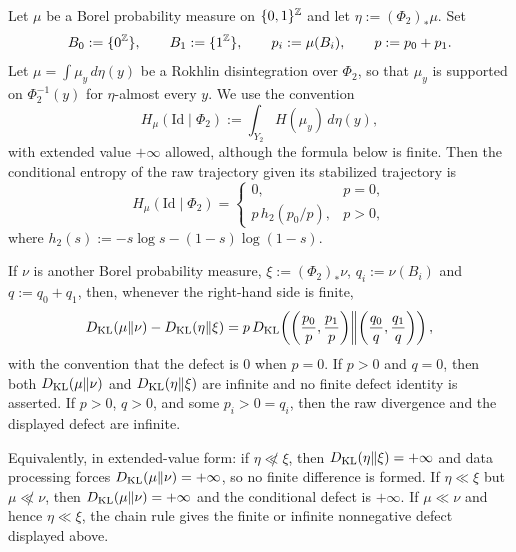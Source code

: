 \begin{corollary}\label{cor:m2-defect-formulas}
Let $\mu$ be a Borel probability measure on $\{0,1\}^{\mathbb{Z}}$ and let
$\eta:=(\Phi_2)_*\mu$.  Set
\[
B_0:=\{0^{\mathbb{Z}}\},\qquad B_1:=\{1^{\mathbb{Z}}\},\qquad
p_i:=\mu(B_i),\qquad p:=p_0+p_1.
\]
Let $\mu=\int\mu_y\,d\eta(y)$ be a Rokhlin disintegration over $\Phi_2$,
so that $\mu_y$ is supported on $\Phi_2^{-1}(y)$ for $\eta$-almost every
$y$.  We use the convention
\[
H_\mu(\mathrm{Id}\mid\Phi_2)
:=\int_{Y_2}H(\mu_y)\,d\eta(y),
\]
with extended value $+\infty$ allowed, although the formula below is finite.
Then the conditional entropy of the raw trajectory given its stabilized
trajectory is
\[
H_\mu(\mathrm{Id}\mid \Phi_2)=
\begin{cases}
0, & p=0,\\[1mm]
p\,h_2(p_0/p), & p>0,
\end{cases}
\]
where $h_2(s):=-s\log s-(1-s)\log(1-s)$.

If $\nu$ is another Borel probability measure, $\xi:=(\Phi_2)_*\nu$,
$q_i:=\nu(B_i)$ and $q:=q_0+q_1$, then, whenever the right-hand side is finite,
\[
D_{\mathrm{KL}}(\mu\|\nu)-D_{\mathrm{KL}}(\eta\|\xi)
=
p\,D_{\mathrm{KL}}\!\left(
\left(\frac{p_0}{p},\frac{p_1}{p}\right)
\middle\|
\left(\frac{q_0}{q},\frac{q_1}{q}\right)
\right),
\]
with the convention that the defect is $0$ when $p=0$.  If $p>0$ and $q=0$,
then both $D_{\mathrm{KL}}(\mu\|\nu)$ and $D_{\mathrm{KL}}(\eta\|\xi)$ are infinite and no
finite defect identity is asserted.  If $p>0$, $q>0$, and some $p_i>0=q_i$,
then the raw divergence and the displayed defect are infinite.

Equivalently, in extended-value form: if $\eta\not\ll\xi$, then
$D_{\mathrm{KL}}(\eta\|\xi)=+\infty$ and data processing forces
$D_{\mathrm{KL}}(\mu\|\nu)=+\infty$, so no finite difference is formed. If
$\eta\ll\xi$ but $\mu\not\ll\nu$, then $D_{\mathrm{KL}}(\mu\|\nu)=+\infty$ and the
conditional defect is $+\infty$. If $\mu\ll\nu$ and hence $\eta\ll\xi$, the
chain rule gives the finite or infinite nonnegative defect displayed above.
\end{corollary}


